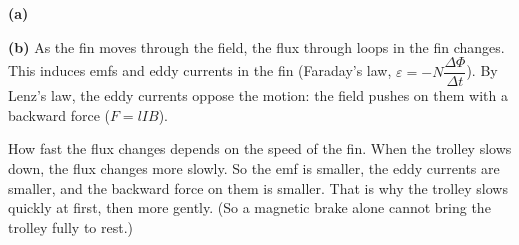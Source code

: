 \begin{practiceanswers}
\begin{practiceans}
  \textbf{(a)}

  \begin{modelanswer}
  \textbf{(b)} As the fin moves through the field, the flux through loops in the fin changes. This
  induces emfs and eddy currents in the fin (Faraday's law,
  $\varepsilon = -N\dfrac{\Delta\Phi}{\Delta t}$). By Lenz's law, the eddy currents oppose
  the motion: the field pushes on them with a backward force ($F = lIB$).

  How fast the flux changes depends on the speed of the fin. When the trolley slows down,
  the flux changes more slowly. So the emf is smaller, the eddy currents are smaller, and
  the backward force on them is smaller. That is why the trolley slows quickly at first, then
  more gently. (So a magnetic brake alone cannot bring the trolley fully to rest.)
  \end{modelanswer}
  \begin{markingcriteria}
  \end{markingcriteria}
\end{practiceans}


\end{practiceanswers}
